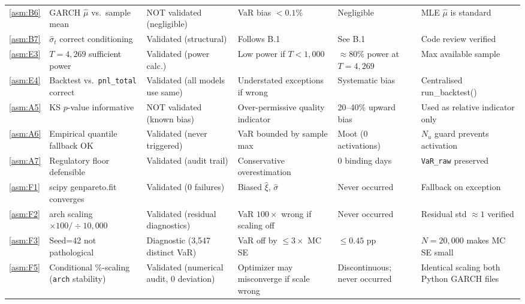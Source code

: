 \documentclass[11pt,a4paper]{article}
\newcommand{\code}[1]{\texttt{#1}}
\begin{document}
\begin{footnotesize}
\begin{longtable}{@{}p{0.65cm} p{4.0cm} p{2.6cm} p{3.4cm} p{2.0cm} p{2.8cm}@{}}
\cref{asm:B6}  & GARCH $\hat{\mu}$ vs.\ sample mean & NOT validated (negligible) & VaR bias $<0.1\%$ & Negligible & MLE $\hat{\mu}$ is standard \\[4pt]

\cref{asm:B7}  & $\hat{\sigma}_t$ correct conditioning & Validated (structural) & Follows B.1 & See B.1 & Code review verified \\[4pt]

\cref{asm:E3}  & $T=4{,}269$ sufficient power & Validated (power calc.) & Low power if $T<1{,}000$ & $\approx 80\%$ power at $T=4{,}269$ & Max available sample \\[4pt]

\cref{asm:E4}  & Backtest vs.\ \code{pnl\_total} correct & Validated (all models use same) & Understated exceptions if wrong & Systematic bias & Centralised run\_backtest() \\[4pt]

\cref{asm:A5}  & KS $p$-value informative & NOT validated (known bias) & Over-permissive quality indicator & 20--40\% upward bias & Used as relative indicator only \\[4pt]

\cref{asm:A6}  & Empirical quantile fallback OK & Validated (never triggered) & VaR bounded by sample max & Moot (0 activations) & $N_u$ guard prevents activation \\[4pt]

\cref{asm:A7}  & Regulatory floor defensible & Validated (audit trail) & Conservative overestimation & 0 binding days & \code{VaR\_raw} preserved \\[4pt]

\cref{asm:F1}  & scipy genpareto.fit converges & Validated (0 failures) & Biased $\hat{\xi}$, $\hat{\sigma}$ & Never occurred & Fallback on exception \\[4pt]

\cref{asm:F2}  & arch scaling $\times100/\div10{,}000$ & Validated (residual diagnostics) & VaR $100\times$ wrong if scaling off & Never occurred & Residual std $\approx 1$ verified \\[4pt]

\cref{asm:F3}  & Seed=42 not pathological & Diagnostic (3{,}547 distinct VaR) & VaR off by $\le 3\times$ MC SE & $\le 0.45$ pp & $N=20{,}000$ makes MC SE small \\[4pt]

\cref{asm:F5}  & Conditional \%-scaling (\texttt{arch} stability) & Validated (numerical audit, 0 deviation) & Optimizer may misconverge if scale wrong & Discontinuous; never occurred & Identical scaling both Python GARCH files \\[4pt]

\end{longtable}
\end{footnotesize}
\end{document}
